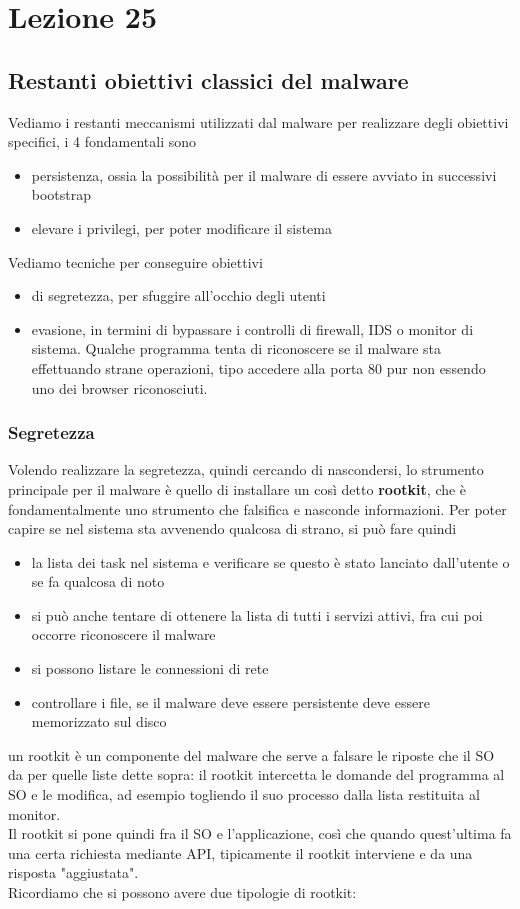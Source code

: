 \documentclass[12pt, oneside]{extbook}
\begin{document}
\chapter{Lezione 25}
\section{Restanti obiettivi classici del malware}
Vediamo i restanti meccanismi utilizzati dal malware per realizzare degli obiettivi specifici, i 4 fondamentali sono
\begin{itemize}
	\item persistenza, ossia la possibilità per il malware di essere avviato in successivi bootstrap
	\item elevare i privilegi, per poter modificare il sistema
\end{itemize}
Vediamo tecniche per conseguire obiettivi
\begin{itemize}
	\item di segretezza, per sfuggire all'occhio degli utenti
	\item evasione, in termini di bypassare i controlli di firewall, IDS o monitor di sistema. Qualche programma tenta di riconoscere se il malware sta effettuando strane operazioni, tipo accedere alla porta 80 pur non essendo uno dei browser riconosciuti.
\end{itemize}
\subsection{Segretezza}
Volendo realizzare la segretezza, quindi cercando di nascondersi, lo strumento principale per il malware è quello di installare un così detto \textbf{rootkit}, che è fondamentalmente uno strumento che falsifica e nasconde informazioni. Per poter capire se nel sistema sta avvenendo qualcosa di strano, si può fare quindi 
\begin{itemize}
	\item la lista dei task nel sistema e verificare se questo è stato lanciato dall'utente o se fa qualcosa di noto
	\item si può anche tentare di ottenere la lista di tutti i servizi attivi, fra cui poi occorre riconoscere il malware
	\item si possono listare le connessioni di rete
	\item controllare i file, se il malware deve essere persistente deve essere memorizzato sul disco
\end{itemize}
un rootkit è un componente del malware che serve a falsare le riposte che il SO da per quelle liste dette sopra: il rootkit intercetta le domande del programma al SO e le modifica, ad esempio togliendo il suo processo dalla lista restituita al monitor.\\Il rootkit si pone quindi fra il SO e l'applicazione, così che quando quest'ultima fa una certa richiesta mediante API, tipicamente il rootkit interviene e da una risposta "aggiustata".\\Ricordiamo che si possono avere due tipologie di rootkit:
\end{document}
